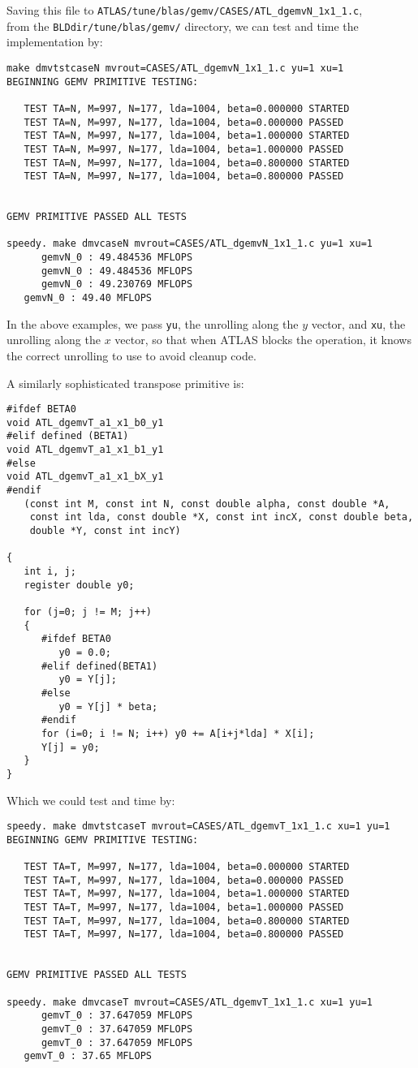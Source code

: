 \documentclass[11pt]{article}
\begin{document}
Saving this file to 
{\tt ATLAS/tune/blas/gemv/CASES/ATL\_dgemvN\_1x1\_1.c}, \\from the
{\tt BLDdir/tune/blas/gemv/} directory, we can test and time
the implementation by:
\begin{verbatim}
make dmvtstcaseN mvrout=CASES/ATL_dgemvN_1x1_1.c yu=1 xu=1
BEGINNING GEMV PRIMITIVE TESTING:

   TEST TA=N, M=997, N=177, lda=1004, beta=0.000000 STARTED
   TEST TA=N, M=997, N=177, lda=1004, beta=0.000000 PASSED
   TEST TA=N, M=997, N=177, lda=1004, beta=1.000000 STARTED
   TEST TA=N, M=997, N=177, lda=1004, beta=1.000000 PASSED
   TEST TA=N, M=997, N=177, lda=1004, beta=0.800000 STARTED
   TEST TA=N, M=997, N=177, lda=1004, beta=0.800000 PASSED


GEMV PRIMITIVE PASSED ALL TESTS

speedy. make dmvcaseN mvrout=CASES/ATL_dgemvN_1x1_1.c yu=1 xu=1
      gemvN_0 : 49.484536 MFLOPS
      gemvN_0 : 49.484536 MFLOPS
      gemvN_0 : 49.230769 MFLOPS
   gemvN_0 : 49.40 MFLOPS
\end{verbatim}

In the above examples, we pass {\tt yu}, the unrolling along the $y$ vector,
and {\tt xu}, the unrolling along the $x$ vector, so that when ATLAS
blocks the operation, it knows the correct unrolling to use to avoid
cleanup code.

A similarly sophisticated transpose primitive is:
\begin{verbatim}
#ifdef BETA0
void ATL_dgemvT_a1_x1_b0_y1
#elif defined (BETA1)
void ATL_dgemvT_a1_x1_b1_y1
#else
void ATL_dgemvT_a1_x1_bX_y1
#endif
   (const int M, const int N, const double alpha, const double *A,
    const int lda, const double *X, const int incX, const double beta,
    double *Y, const int incY)

{
   int i, j;
   register double y0;

   for (j=0; j != M; j++)
   {
      #ifdef BETA0
         y0 = 0.0;
      #elif defined(BETA1)
         y0 = Y[j];
      #else
         y0 = Y[j] * beta;
      #endif
      for (i=0; i != N; i++) y0 += A[i+j*lda] * X[i];
      Y[j] = y0;
   }
}
\end{verbatim}

Which we could test and time by:
\begin{verbatim}
speedy. make dmvtstcaseT mvrout=CASES/ATL_dgemvT_1x1_1.c xu=1 yu=1
BEGINNING GEMV PRIMITIVE TESTING:

   TEST TA=T, M=997, N=177, lda=1004, beta=0.000000 STARTED
   TEST TA=T, M=997, N=177, lda=1004, beta=0.000000 PASSED
   TEST TA=T, M=997, N=177, lda=1004, beta=1.000000 STARTED
   TEST TA=T, M=997, N=177, lda=1004, beta=1.000000 PASSED
   TEST TA=T, M=997, N=177, lda=1004, beta=0.800000 STARTED
   TEST TA=T, M=997, N=177, lda=1004, beta=0.800000 PASSED


GEMV PRIMITIVE PASSED ALL TESTS

speedy. make dmvcaseT mvrout=CASES/ATL_dgemvT_1x1_1.c xu=1 yu=1
      gemvT_0 : 37.647059 MFLOPS
      gemvT_0 : 37.647059 MFLOPS
      gemvT_0 : 37.647059 MFLOPS
   gemvT_0 : 37.65 MFLOPS
\end{verbatim}
\end{document}
